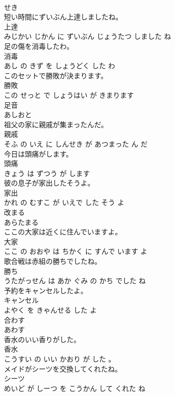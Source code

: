 \documentclass[8pt]{extreport}
\begin{document}
\begin{CJK}{UTF8}{min}
\\	せき		
\\	短い時間にずいぶん上達しましたね。	
\\	上達 
\\	みじかい じかん に ずいぶん じょうたつ しました ね			
\\	足の傷を消毒したわ。	
\\	消毒 
\\	あし の きず を しょうどく した わ			
\\	このセットで勝敗が決まります。	
\\	勝敗 
\\	この せっと で しょうはい が きまります			
\\	足音	
\\	あしおと		
\\	祖父の家に親戚が集まったんだ。	
\\	親戚 
\\	そふ の いえ に しんせき が あつまった ん だ			
\\	今日は頭痛がします。	
\\	頭痛 
\\	きょう は ずつう が します			
\\	彼の息子が家出したそうよ。	
\\	家出 
\\	かれ の むすこ が いえで した そう よ			
\\	改まる	
\\	あらたまる		
\\	ここの大家は近くに住んでいますよ。	
\\	大家 
\\	ここ の おおや は ちかく に すんで います よ			
\\	歌合戦は赤組の勝ちでしたね。	
\\	勝ち 
\\	うたがっせん は あか ぐみ の かち でした ね			
\\	予約をキャンセルしたよ。	
\\	キャンセル 
\\	よやく を きゃんせる した よ			
\\	合わす	
\\	あわす		
\\	香水のいい香りがした。	
\\	香水 
\\	こうすい の いい かおり が した 。			
\\	メイドがシーツを交換してくれたね。	
\\	シーツ 
\\	めいど が しーつ を こうかん して くれた ね			

\end{CJK}
\end{document}
